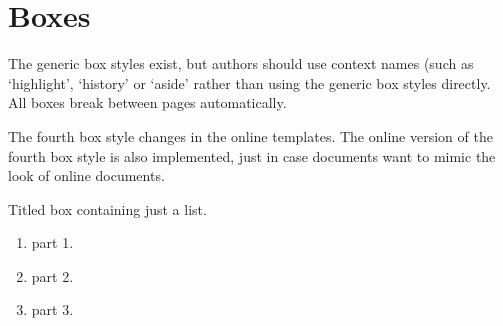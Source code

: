 \documentclass[solutionsatend]{ouunit}
\begin{document}
\section{Boxes}
The generic box styles exist, but authors should use context names (such as `highlight', `history' or `aside' rather than using the generic box styles directly. All boxes break between pages automatically.
\begin{style1box}
\lipsum[1]
\end{style1box}
\begin{style2box}
\lipsum[2]
\end{style2box}
\begin{style3box}
\lipsum[3]
\end{style3box}
\begin{style3box}
\lipsum[3]
\end{style3box}
\begin{style4box}
\lipsum[4]
\end{style4box}
The fourth box style changes in the online templates. The online version of the fourth box style is also implemented, just in case documents want to mimic the look of online documents.
\begin{onlinestyle4box}
\lipsum[4]
\end{onlinestyle4box}
Titled box containing just a list.
\begin{style4box}[Solution]
\begin{enumerate}
\item part 1.
\item part 2.
\item part 3.
\end{enumerate}
\end{style4box}
\end{document}
